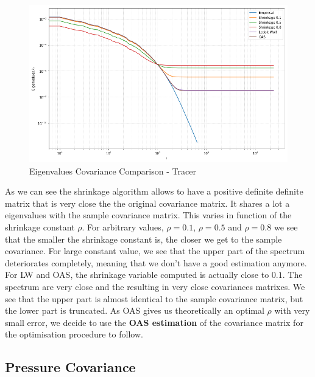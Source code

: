 \begin{figure}[h!]
\centering
    \includegraphics[width=0.8\linewidth]{figures/Covariance/Tracer_23643/cov_all_eigenval_loglog_zoom}
    \caption{Eigenvalues Covariance Comparison - Tracer}
    \label{fig:cov:comparison:eigs}
\end{figure}

As we can see the shrinkage algorithm allows to have a positive definite definite matrix that is very close the the original covariance matrix. It shares a lot a eigenvalues with the sample covariance matrix. This varies in function of the shrinkage constant $\rho$. For arbitrary values, $\rho = 0.1$,  $\rho= 0.5$ and  $\rho= 0.8$ we see that the smaller the shrinkage constant is, the closer we get to the sample covariance. For large constant value, we see that the upper part of the spectrum deteriorates completely, meaning that we don't have a good estimation anymore.  \\

For LW and OAS, the shrinkage variable computed is actually close to $0.1$. The spectrum are very close and the resulting in very close covariances matrixes. We see that the upper part is almost identical to the sample covariance matrix, but the lower part is truncated. As OAS gives us theoretically an optimal $\rho$ with very small error, we decide to use the \textbf{OAS estimation} of the covariance matrix for the optimisation procedure to follow.


\subsection{Pressure Covariance}

